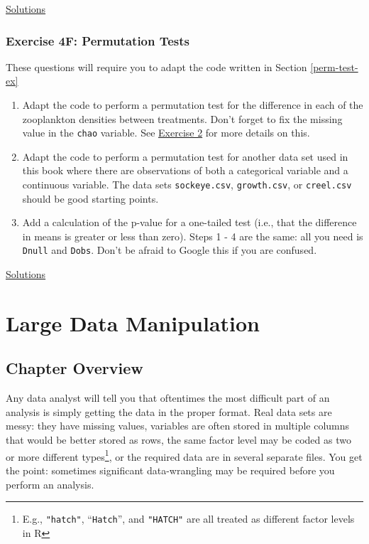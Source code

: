 \documentclass[]{book}
\providecommand{\tightlist}{%
  \setlength{\itemsep}{0pt}\setlength{\parskip}{0pt}}
\let\rmarkdownfootnote\footnote%
\def\footnote{\protect\rmarkdownfootnote}
\theoremstyle{definition}
\theoremstyle{definition}
\theoremstyle{definition}
\theoremstyle{remark}
\begin{document}
\protect\hyperlink{ex4e-answers}{Solutions}

\subsection*{Exercise 4F: Permutation
Tests}\label{exercise-4f-permutation-tests}

These questions will require you to adapt the code written in Section
\ref{perm-test-ex}

\begin{enumerate}
\def\labelenumi{\arabic{enumi}.}
\tightlist
\item
  Adapt the code to perform a permutation test for the difference in
  each of the zooplankton densities between treatments. Don't forget to
  fix the missing value in the \texttt{chao} variable. See
  \protect\hyperlink{ex1b}{Exercise 2} for more details on this.
\item
  Adapt the code to perform a permutation test for another data set used
  in this book where there are observations of both a categorical
  variable and a continuous variable. The data sets
  \texttt{sockeye.csv}, \texttt{growth.csv}, or \texttt{creel.csv}
  should be good starting points.
\item
  Add a calculation of the p-value for a one-tailed test (i.e., that the
  difference in means is greater or less than zero). Steps 1 - 4 are the
  same: all you need is \texttt{Dnull} and \texttt{Dobs}. Don't be
  afraid to Google this if you are confused.
\end{enumerate}

\protect\hyperlink{ex4f-answers}{Solutions}

\chapter{Large Data Manipulation}\label{ch5}

\section*{Chapter Overview}\label{chapter-overview-4}

Any data analyst will tell you that oftentimes the most difficult part
of an analysis is simply getting the data in the proper format. Real
data sets are messy: they have missing values, variables are often
stored in multiple columns that would be better stored as rows, the same
factor level may be coded as two or more different types\footnote{E.g.,
  \texttt{"hatch"}, ``\texttt{Hatch}'', and \texttt{"HATCH"} are all
  treated as different factor levels in R}, or the required data are in
several separate files. You get the point: sometimes significant
data-wrangling may be required before you perform an analysis.
\end{document}
